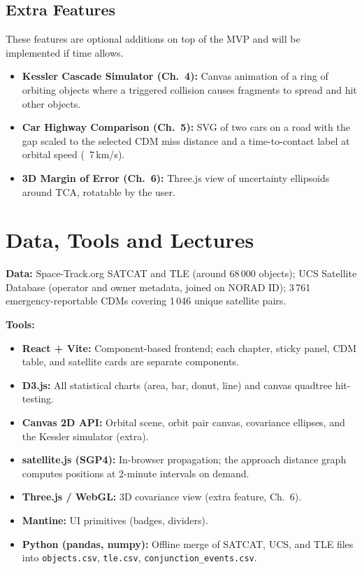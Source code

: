 \subsection*{Extra Features}
These features are optional additions on top of the MVP and will be implemented if time allows.
\begin{itemize}[noitemsep, topsep=3pt]
    \item \textbf{Kessler Cascade Simulator (Ch.\ 4):} Canvas animation of a ring of orbiting objects where a triggered collision causes fragments to spread and hit other objects.
    \item \textbf{Car Highway Comparison (Ch.\ 5):} SVG of two cars on a road with the gap scaled to the selected CDM miss distance and a time-to-contact label at orbital speed (~7\,km/s).
    \item \textbf{3D Margin of Error (Ch.\ 6):} Three.js view of uncertainty ellipsoids around TCA, rotatable by the user.
\end{itemize}

\section{Data, Tools and Lectures}

\textbf{Data:}
Space-Track.org SATCAT and TLE (around 68\,000 objects); UCS Satellite Database (operator and owner metadata, joined on NORAD ID); 3\,761 emergency-reportable CDMs covering 1\,046 unique satellite pairs.

\textbf{Tools:}
\begin{itemize}[noitemsep, topsep=3pt]
    \item \textbf{React + Vite:} Component-based frontend; each chapter, sticky panel, CDM table, and satellite cards are separate components.
    \item \textbf{D3.js:} All statistical charts (area, bar, donut, line) and canvas quadtree hit-testing.
    \item \textbf{Canvas 2D API:} Orbital scene, orbit pair canvas, covariance ellipses, and the Kessler simulator (extra).
    \item \textbf{satellite.js (SGP4):} In-browser propagation; the approach distance graph computes positions at 2-minute intervals on demand.
    \item \textbf{Three.js / WebGL:} 3D covariance view (extra feature, Ch.\ 6).
    \item \textbf{Mantine:} UI primitives (badges, dividers).
    \item \textbf{Python (pandas, numpy):} Offline merge of SATCAT, UCS, and TLE files into \texttt{objects.csv}, \texttt{tle.csv}, \texttt{conjunction\_events.csv}.
\end{itemize}

